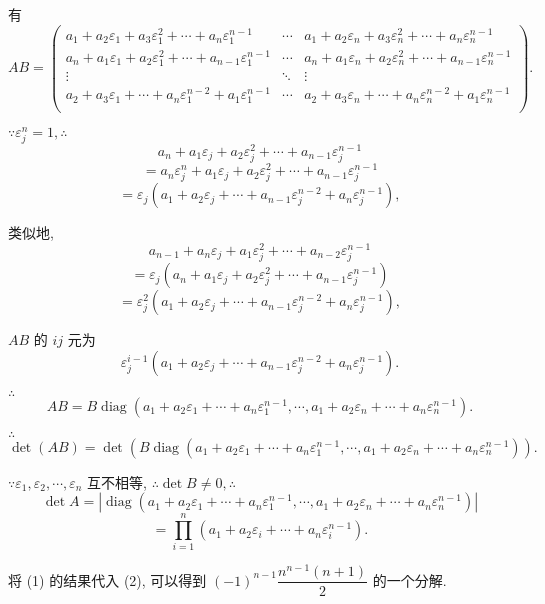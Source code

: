 \documentclass{ctexart}
\begin{document}
\begin{solution}
    有
    \[AB=\begin{pmatrix}
        a_1+a_2\varepsilon_1+a_3\varepsilon_1^2+\cdots+a_n\varepsilon_1^{n-1} & \cdots & a_1+a_2\varepsilon_n+a_3\varepsilon_n^2+\cdots+a_n\varepsilon_n^{n-1} \\
        a_n+a_1\varepsilon_1+a_2\varepsilon_1^2+\cdots+a_{n-1}\varepsilon_1^{n-1} & \cdots & a_n+a_1\varepsilon_n+a_2\varepsilon_n^2+\cdots+a_{n-1}\varepsilon_n^{n-1} \\
        \vdots & \ddots & \vdots \\
        a_2+a_3\varepsilon_1+\cdots+a_n\varepsilon_1^{n-2}+a_1\varepsilon_1^{n-1} & \cdots & a_2+a_3\varepsilon_n+\cdots+a_n\varepsilon_n^{n-2}+a_1\varepsilon_n^{n-1} \\
    \end{pmatrix}.\]

    $\because\varepsilon_j^n=1,\therefore$
    \[a_n+a_1\varepsilon_j+a_2\varepsilon_j^2+\cdots+a_{n-1}\varepsilon_j^{n-1}\]
    \[=a_n\varepsilon_j^n+a_1\varepsilon_j+a_2\varepsilon_j^2+\cdots+a_{n-1}\varepsilon_j^{n-1}\]
    \[=\varepsilon_j(a_1+a_2\varepsilon_j+\cdots+a_{n-1}\varepsilon_j^{n-2}+a_n\varepsilon_j^{n-1}),\]

    类似地,
    \[a_{n-1}+a_n\varepsilon_j+a_1\varepsilon_j^2+\cdots+a_{n-2}\varepsilon_j^{n-1}\]
    \[=\varepsilon_j(a_n+a_1\varepsilon_j+a_2\varepsilon_j^2+\cdots+a_{n-1}\varepsilon_j^{n-1})\]
    \[=\varepsilon_j^2(a_1+a_2\varepsilon_j+\cdots+a_{n-1}\varepsilon_j^{n-2}+a_n\varepsilon_j^{n-1}),\]

    $AB$ 的 $ij$ 元为
    \[\varepsilon_j^{i-1}(a_1+a_2\varepsilon_j+\cdots+a_{n-1}\varepsilon_j^{n-2}+a_n\varepsilon_j^{n-1}).\]

    $\therefore$
    \[AB=B\operatorname{diag}(a_1+a_2\varepsilon_1+\cdots+a_n\varepsilon_1^{n-1},\cdots,a_1+a_2\varepsilon_n+\cdots+a_n\varepsilon_n^{n-1}).\]

    $\therefore$
    \[\det(AB)=\det(B\operatorname{diag}(a_1+a_2\varepsilon_1+\cdots+a_n\varepsilon_1^{n-1},\cdots,a_1+a_2\varepsilon_n+\cdots+a_n\varepsilon_n^{n-1})).\]

    $\because\varepsilon_1,\varepsilon_2,\cdots,\varepsilon_n$ 互不相等, $\therefore\det B\neq0,\therefore$
    \[\det A=|\operatorname{diag}(a_1+a_2\varepsilon_1+\cdots+a_n\varepsilon_1^{n-1},\cdots,a_1+a_2\varepsilon_n+\cdots+a_n\varepsilon_n^{n-1})|\]
    \[=\prod\limits_{i=1}^n(a_1+a_2\varepsilon_i+\cdots+a_n\varepsilon_i^{n-1}).\]
\end{solution}
\begin{note}
    将 (1) 的结果代入 (2), 可以得到 $(-1)^{n-1}\dfrac{n^{n-1}(n+1)}{2}$ 的一个分解.
\end{note}
\end{document}

